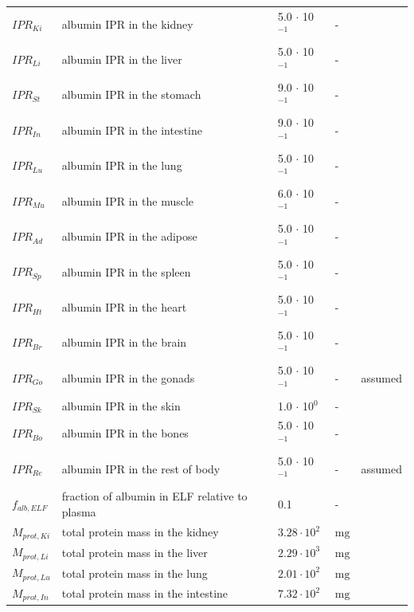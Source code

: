 \documentclass[preprint,12pt,authoryear]{elsarticle}
\begin{document}
\begin{longtable}{P{2cm}P{3.5cm}P{2cm}P{1cm}P{2.5cm}}
$IPR_{Ki}$ & albumin IPR in the kidney & 5.0 $\cdot$ 10$^{-1}$ & - & \citep{kawai_1994} \\
$IPR_{Li}$ & albumin IPR in the liver & 5.0 $\cdot$ 10$^{-1}$ & - & \citep{kawai_1994} \\
$IPR_{St}$ & albumin IPR in the stomach & 9.0 $\cdot$ 10$^{-1}$ & - & \citep{kawai_1994} \\
$IPR_{In}$ & albumin IPR in the intestine & 9.0 $\cdot$ 10$^{-1}$ & - & \citep{kawai_1994} \\
$IPR_{Lu}$ & albumin IPR in the lung & 5.0 $\cdot$ 10$^{-1}$ & - & \citep{kawai_1994} \\
$IPR_{Mu}$ & albumin IPR in the muscle & 6.0 $\cdot$ 10$^{-1}$ & - & \citep{kawai_1994} \\
$IPR_{Ad}$ & albumin IPR in the adipose & 5.0 $\cdot$ 10$^{-1}$ & - & \citep{kawai_1994} \\
$IPR_{Sp}$ & albumin IPR in the spleen & 5.0 $\cdot$ 10$^{-1}$ & - & \citep{kawai_1994} \\
$IPR_{Ht}$ & albumin IPR in the heart & 5.0 $\cdot$ 10$^{-1}$ & - & \citep{kawai_1994} \\
$IPR_{Br}$ & albumin IPR in the brain & 5.0 $\cdot$ 10$^{-1}$ & - & \citep{kawai_1994} \\
$IPR_{Go}$ & albumin IPR in the gonads & 5.0 $\cdot$ 10$^{-1}$ & - & assumed \\
$IPR_{Sk}$ & albumin IPR in the skin & 1.0 $\cdot$ 10$^0$ & - & \citep{kawai_1994} \\
$IPR_{Bo}$ & albumin IPR in the bones & 5.0 $\cdot$ 10$^{-1}$ & - & \citep{kawai_1994} \\
$IPR_{Re}$ & albumin IPR in the rest of body & 5.0 $\cdot$ 10$^{-1}$ & - & assumed\\
$f_{alb,ELF}$ & fraction of albumin in ELF relative to plasma & 0.1 & - & \citep{woods_2015}\\

\midrule\midrule

$M_{prot,Ki}$ & total protein mass in the kidney  & $3.28 \cdot 10^{2}$ & $\text{mg}$ & \citep{addis_1936} \\
$M_{prot,Li}$ & total protein mass in the liver   & $2.29 \cdot 10^{3}$ & $\text{mg}$ & \citep{addis_1936} \\
$M_{prot,Lu}$ & total protein mass in the lung    & $2.01 \cdot 10^{2}$ & $\text{mg}$ & \citep{awakan_2021} \\
$M_{prot,In}$ & total protein mass in the intestine & $7.32 \cdot 10^{2}$ & $\text{mg}$ & \citep{vanderkerkhof_2007} \\


\end{longtable}
\end{document}
